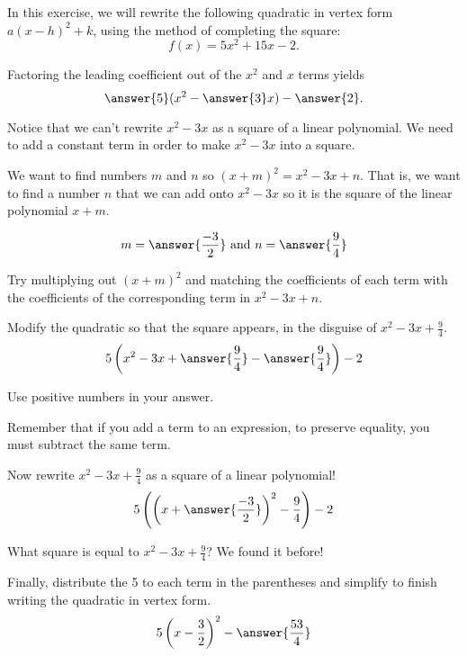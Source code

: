 \documentclass{ximera}
\author{Kenneth Berglund}
\begin{document}
In this exercise, we will rewrite the following quadratic in vertex form $a(x - h)^2 + k$, using the method of completing the square:
\[
f(x)=5x^2+15x-2.
\]
\begin{exercise}

Factoring the leading coefficient out of the $x^2$ and $x$ terms yields
$$
\answer{5}(x^2 - \answer{3}x) - \answer{2}.
$$

\begin{exercise}
Notice that we can't rewrite $x^2 - 3x$ as a square of a linear polynomial. We need to add a constant term in order to make $x^2 - 3x$ into a square. 

We want to find numbers $m$ and $n$ so $(x + m)^2 = x^2 - 3x + n$. That is, we want to find a number $n$ that we can add onto $x^2 - 3x$ so it is the square of the linear polynomial $x + m$. 

$$
m = \answer{\frac{-3}{2}} \text{ and } n = \answer{\frac{9}{4}}
$$
\begin{hint}
Try multiplying out $(x + m)^2$ and matching the coefficients of each term with the coefficients of the corresponding term in $x^2 - 3x + n$. 
\end{hint}


\begin{exercise}
Modify the quadratic so that the square appears, in the disguise of $x^2 - 3x + \frac{9}{4}$.
$$
5\left(x^2 - 3x + \answer{\frac{9}{4}} - \answer{\frac{9}{4}}\right) - 2
$$ 

Use positive numbers in your answer.

\begin{hint}
Remember that if you add a term to an expression, to preserve equality, you must subtract the same term.
\end{hint}

\begin{exercise}
Now rewrite $x^2 - 3x + \frac{9}{4}$ as a square of a linear polynomial!
$$
5\left(\left(x + \answer{\frac{-3}{2}}\right)^2 - \frac{9}{4}\right) -2
$$ 
\begin{hint}
What square is equal to $x^2 - 3x + \frac{9}{4}$? We found it before!
\end{hint}

\begin{exercise}
Finally, distribute the 5 to each term in the parentheses and simplify to finish writing the quadratic in vertex form.
$$
5\left(x -\frac{3}{2}\right)^2 - \answer{\frac{53}{4}}
$$ 


\end{exercise}
\end{exercise}
\end{exercise}
\end{exercise}
\end{exercise}
\end{document}

